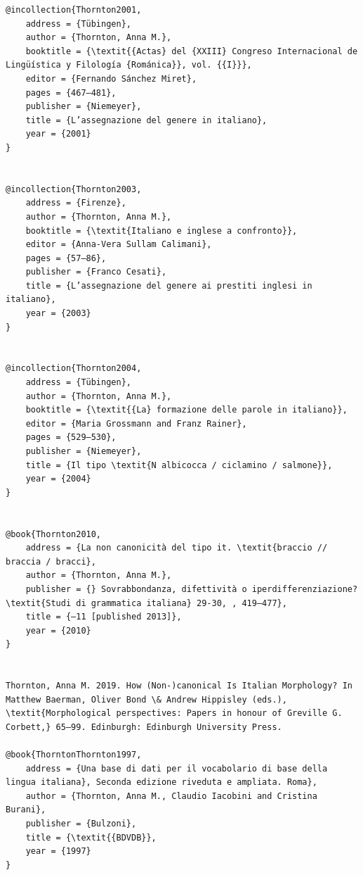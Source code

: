 \documentclass[output=paper]{langscibook}
\begin{document}
\begin{verbatim}
@incollection{Thornton2001,
	address = {Tübingen},
	author = {Thornton, Anna M.},
	booktitle = {\textit{{Actas} del {XXIII} Congreso Internacional de Lingüística y Filología {Románica}}, vol. {{I}}},
	editor = {Fernando Sánchez Miret},
	pages = {467–481},
	publisher = {Niemeyer},
	title = {L’assegnazione del genere in italiano},
	year = {2001}
}


@incollection{Thornton2003,
	address = {Firenze},
	author = {Thornton, Anna M.},
	booktitle = {\textit{Italiano e inglese a confronto}},
	editor = {Anna-Vera Sullam Calimani},
	pages = {57–86},
	publisher = {Franco Cesati},
	title = {L’assegnazione del genere ai prestiti inglesi in italiano},
	year = {2003}
}


@incollection{Thornton2004,
	address = {Tübingen},
	author = {Thornton, Anna M.},
	booktitle = {\textit{{La} formazione delle parole in italiano}},
	editor = {Maria Grossmann and Franz Rainer},
	pages = {529–530},
	publisher = {Niemeyer},
	title = {Il tipo \textit{N albicocca / ciclamino / salmone}},
	year = {2004}
}


@book{Thornton2010,
	address = {La non canonicità del tipo it. \textit{braccio // braccia / bracci},
	author = {Thornton, Anna M.},
	publisher = {} Sovrabbondanza, difettività o iperdifferenziazione? \textit{Studi di grammatica italiana} 29-30, , 419–477},
	title = {–11 [published 2013]},
	year = {2010}
}


Thornton, Anna M. 2019. How (Non-)canonical Is Italian Morphology? In Matthew Baerman, Oliver Bond \& Andrew Hippisley (eds.), \textit{Morphological perspectives: Papers in honour of Greville G. Corbett,} 65–99. Edinburgh: Edinburgh University Press.

@book{ThorntonThornton1997,
	address = {Una base di dati per il vocabolario di base della lingua italiana}, Seconda edizione riveduta e ampliata. Roma},
	author = {Thornton, Anna M., Claudio Iacobini and Cristina Burani},
	publisher = {Bulzoni},
	title = {\textit{{BDVDB}},
	year = {1997}
}


\end{verbatim}
\sloppy\printbibliography[heading=subbibliography,notkeyword=this]
\end{document}
